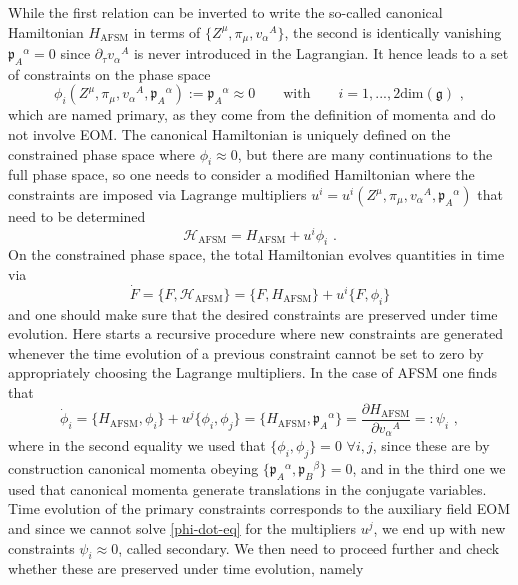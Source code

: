 \documentclass[12pt]{article}
\numberwithin{equation}{section}
\begin{document}
While the first relation can be inverted to write the so-called canonical Hamiltonian $H_{\text{AFSM}}$ in terms of $\{Z^{\mu},\pi_{\mu},v_{\alpha}{}^{A}\}$, the second is identically vanishing  $\mathfrak{p}_{A}{}^{\alpha}=0$ since $\partial_{\tau}v_{\alpha}{}^{A}$ is never introduced in the Lagrangian.
It hence leads to a set of constraints on the phase space
\begin{equation}
\phi_{i}(Z^{\mu},\pi_{\mu},v_{\alpha}{}^{A},\mathfrak{p}_{A}{}^{\alpha}):=\mathfrak{p}_{A}{}^{\alpha}  \approx 0
\qquad \text{with} \qquad i=1,...,2\text{dim}(\mathfrak{g}) \,\, ,
\end{equation}
which are named primary, as they come from the definition of momenta and do not involve EOM. The canonical Hamiltonian is uniquely defined on the constrained phase space where $\phi_{i}\approx 0$, but there are many continuations to the full phase space, so one needs to consider a modified Hamiltonian where the constraints are imposed via Lagrange multipliers $u^{i}=u^{i}(Z^{\mu},\pi_{\mu},v_{\alpha}{}^{A},\mathfrak{p}_{A}{}^{\alpha})$ that need to be determined
\begin{equation}
\mathcal{H}_{\text{AFSM}}=H_{\text{AFSM}}+u^{i}\phi_{i} \,\, .
\end{equation}
On the constrained phase space, the total Hamiltonian evolves quantities in time via
\begin{equation}
\dot{F}=\{F,\mathcal{H}_{\text{AFSM}}\}
=\{F,H_{\text{AFSM}}\}+u^{i}\{F,\phi_{i}\} 
\end{equation}
and one should make sure that the desired constraints are preserved under time evolution. Here starts a recursive procedure where new constraints are generated whenever the time evolution of a previous constraint cannot be set to zero by appropriately choosing the Lagrange multipliers. In the case of AFSM one finds that
\begin{equation}\label{phi-dot-eq}
\dot\phi_{i}=\{H_{\text{AFSM}},\phi_{i}\}+u^{j}\{\phi_{i},\phi_{j}\}=\{H_{\text{AFSM}},\mathfrak{p}_{A}{}^{\alpha}\}=\frac{\partial H_{\text{AFSM}}}{\partial v_{\alpha}{}^{A}}
=:\psi_{i} \,\, ,
\end{equation}
where in the second equality we used that $\{\phi_{i},\phi_{j}\}=0 \,\, \forall i,j$, since these are by construction canonical momenta obeying $\{\mathfrak{p}_{A}{}^{\alpha},\mathfrak{p}_{B}{}^{\beta}\}=0$, and in the third one we used that canonical momenta generate translations in the conjugate variables. Time evolution of the primary constraints corresponds to the auxiliary field EOM and since we cannot solve \eqref{phi-dot-eq} for the multipliers $u^j$, we end up with new constraints $\psi_{i}\approx 0$, called secondary. We then need to proceed further and check whether these are preserved under time evolution, namely
\end{document}
